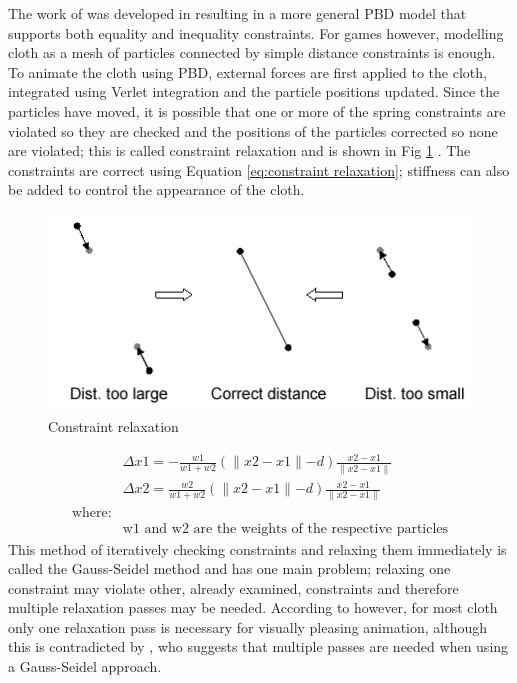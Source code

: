 The work of \textcite{Jakobsen2005} was developed in \textcite{Muller2006} resulting in a more general PBD model that supports both equality and inequality constraints. For games however, modelling cloth as a mesh of particles connected by simple distance constraints is enough.
\\To animate the cloth using PBD, external forces are first applied to the cloth, integrated using Verlet integration and the particle positions updated. Since the particles have moved, it is possible that one or more of the spring constraints are violated so they are checked and the positions of the particles corrected so none are violated; this is called constraint relaxation and is shown in Fig \ref{fig:constraint relaxation} . The constraints are correct using Equation \ref{eq:constraint relaxation}\parencite[4]{Muller2006}; stiffness can also be added to control the appearance of the cloth.
\begin{figure}[tp]
   \begin{center}
     \includegraphics{Figures/pbd}
   \end{center}
   \caption[Constraint relaxation]{Constraint relaxation \parencite[1]{Jakobsen2005}}
   \label{fig:constraint relaxation}
\end{figure}
\begin{equation}
\begin{split}
\label{eq:constraint relaxation}
  &\Delta x1 = - \frac{w1}{w1 + w2}(\parallel x2 - x1 \parallel - d)\frac{x2 - x1}{\parallel x2 - x1 \parallel}
  \\&\Delta x2 = \frac{w2}{w1 + w2}(\parallel x2 - x1 \parallel - d)\frac{x2 - x1}{\parallel x2 - x1 \parallel}
  \\\text{where:}
  \\&\text{w1 and w2 are the weights of the respective particles}
\end{split}
\end{equation}
This method of iteratively checking constraints and relaxing them immediately is called the Gauss-Seidel method and has one main problem; relaxing one constraint may violate other, already examined, constraints and therefore multiple relaxation passes may be needed. According to \textcite{Jakobsen2005} however, for most cloth only one relaxation pass is necessary for visually pleasing animation, although this is contradicted by \parencite{Kim2011}, who suggests that multiple passes are needed when using a Gauss-Seidel approach.
